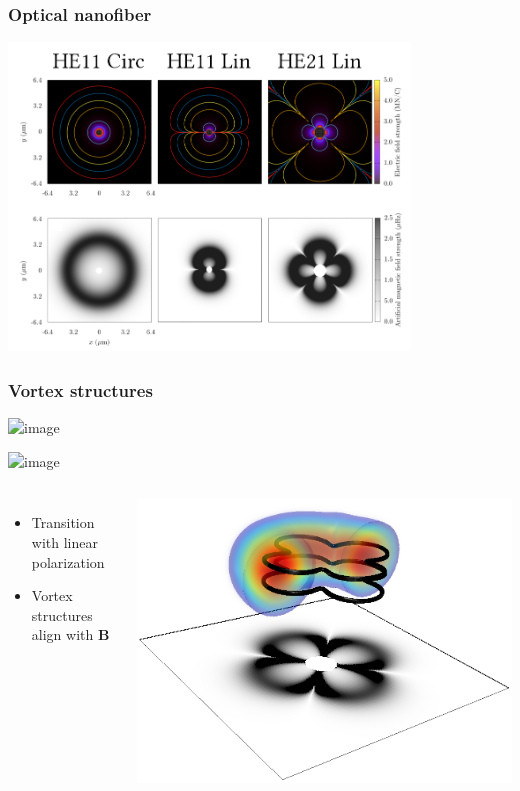 \documentclass{beamer}
\begin{document}
\begin{frame}
\frametitle{Optical nanofiber}
\center \includegraphics[width=0.8\textwidth]{all_fields.png}


\end{frame}

\begin{frame}
\frametitle{Vortex structures}
\begin{center}
\includegraphics<1>[width=\textwidth]{vortex_transition_1.png}

\includegraphics<2->[width=\textwidth]{vortex_transition_2.png}
\end{center}
\begin{columns}
\begin{itemize}
\item Transition with linear polarization
\item Vortex structures align with $\mathbf{B}$
\end{itemize}
\center \includegraphics[width=\linewidth]{../data/3d/HE21_3d.png}
\end{columns}
\end{frame}
\end{document}
